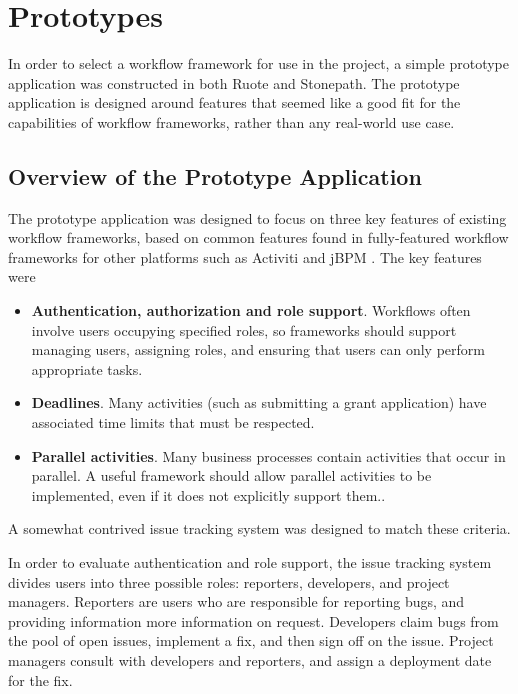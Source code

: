 \documentclass[document.tex]{subfiles}
\begin{document}
\chapter {Prototypes}
\label {ch:prototypes}

In order to select a workflow framework for use in the project, a simple prototype application was constructed in both Ruote and Stonepath. The prototype application is designed around features that seemed like a good fit for the capabilities of workflow frameworks, rather than any real-world use case.


\section {Overview of the Prototype Application}
\label {sec:overview-of-the-prototype-application}

The prototype application was designed to focus on three key features of existing workflow frameworks, based on common features found in fully-featured workflow frameworks for other platforms such as Activiti and jBPM \cite{jbpm}. The key features were

\begin{itemize}
\item \textbf{Authentication, authorization and role support}. Workflows often involve users occupying specified roles, so frameworks should support managing users, assigning roles, and ensuring that users can only perform appropriate tasks.
\item \textbf{Deadlines}. Many activities (such as submitting a grant application) have associated time limits that must be respected.
\item \textbf{Parallel activities}. Many business processes contain activities that occur in parallel. A useful framework should allow parallel activities to be implemented, even if it does not explicitly support them..
\end{itemize}

A somewhat contrived issue tracking system was designed to match these criteria.

In order to evaluate authentication and role support, the issue tracking system divides users into three possible roles: reporters, developers, and project managers. Reporters are users who are responsible for reporting bugs, and providing information more information on request. Developers claim bugs from the pool of open issues, implement a fix, and then sign off on the issue. Project managers consult with developers and reporters, and assign a deployment date for the fix.
\end{document}
